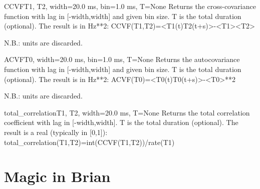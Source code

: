 \documentclass[letterpaper,10pt,english]{manual}
\begin{document}
\hypertarget{brian.CCVF}{}\begin{funcdesc}{CCVF}{T1, T2, width=20.0 ms, bin=1.0 ms, T=None}
Returns the cross-covariance function with lag in {[}-width,width{]} and given bin size.
T is the total duration (optional).
The result is in Hz**2:
CCVF(T1,T2)=\textless{}T1(t)T2(t+s)\textgreater{}-\textless{}T1\textgreater{}\textless{}T2\textgreater{}

N.B.: units are discarded.
\end{funcdesc}

\hypertarget{brian.ACVF}{}\begin{funcdesc}{ACVF}{T0, width=20.0 ms, bin=1.0 ms, T=None}
Returns the autocovariance function with lag in {[}-width,width{]} and given bin size.
T is the total duration (optional).
The result is in Hz**2:
ACVF(T0)=\textless{}T0(t)T0(t+s)\textgreater{}-\textless{}T0\textgreater{}**2

N.B.: units are discarded.
\end{funcdesc}

\hypertarget{brian.total_correlation}{}\begin{funcdesc}{total\_correlation}{T1, T2, width=20.0 ms, T=None}
Returns the total correlation coefficient with lag in {[}-width,width{]}.
T is the total duration (optional).
The result is a real (typically in {[}0,1{]}):
total\_correlation(T1,T2)=int(CCVF(T1,T2))/rate(T1)
\end{funcdesc}

\resetcurrentobjects
{}

\hypertarget{index-83}{}\section{Magic in Brian}
\end{document}
